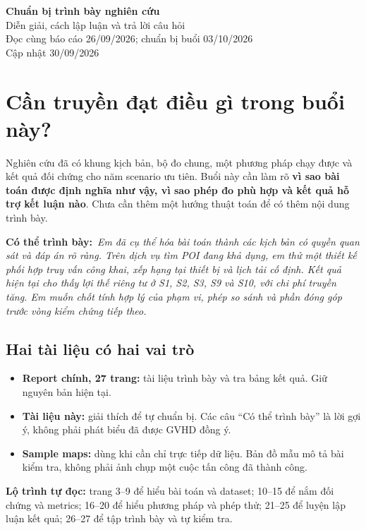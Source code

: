 \documentclass[10pt,a4paper]{article}
\newcommand{\say}[1]{\par\textbf{Có thể trình bày:}\ \textit{#1}\par}
\begin{document}
\begin{center}
{\LARGE\bfseries\color{ink}Chuẩn bị trình bày nghiên cứu}\\[5pt]
{\large Diễn giải, cách lập luận và trả lời câu hỏi}\\[4pt]
{\small Đọc cùng báo cáo 26/09/2026; chuẩn bị buổi 03/10/2026}\\
{\small Cập nhật 30/09/2026}
\end{center}

\section{Cần truyền đạt điều gì trong buổi này?}
Nghiên cứu đã có khung kịch bản, bộ đo chung, một phương pháp chạy được và kết quả đối chứng cho năm scenario ưu tiên. Buổi này cần làm rõ \textbf{vì sao bài toán được định nghĩa như vậy, vì sao phép đo phù hợp và kết quả hỗ trợ kết luận nào}. Chưa cần thêm một hướng thuật toán để có thêm nội dung trình bày.

\say{Em đã cụ thể hóa bài toán thành các kịch bản có quyền quan sát và đáp án rõ ràng. Trên dịch vụ tìm POI đang khả dụng, em thử một thiết kế phối hợp truy vấn công khai, xếp hạng tại thiết bị và lịch tải cố định. Kết quả hiện tại cho thấy lợi thế riêng tư ở S1, S2, S3, S9 và S10, với chi phí truyền tăng. Em muốn chốt tính hợp lý của phạm vi, phép so sánh và phần đóng góp trước vòng kiểm chứng tiếp theo.}

\subsection*{Hai tài liệu có hai vai trò}
\begin{itemize}
\item \textbf{Report chính, 27 trang:} tài liệu trình bày và tra bảng kết quả. Giữ nguyên bản hiện tại.
\item \textbf{Tài liệu này:} giải thích để tự chuẩn bị. Các câu ``Có thể trình bày'' là lời gợi ý, không phải phát biểu đã được GVHD đồng ý.
\item \textbf{Sample maps:} dùng khi cần chỉ trực tiếp dữ liệu. Bản đồ mẫu mô tả bài kiểm tra, không phải ảnh chụp một cuộc tấn công đã thành công.
\end{itemize}

\textbf{Lộ trình tự đọc:} trang 3--9 để hiểu bài toán và dataset; 10--15 để nắm đối chứng và metrics; 16--20 để hiểu phương pháp và phép thử; 21--25 để luyện lập luận kết quả; 26--27 để tập trình bày và tự kiểm tra.
\end{document}
